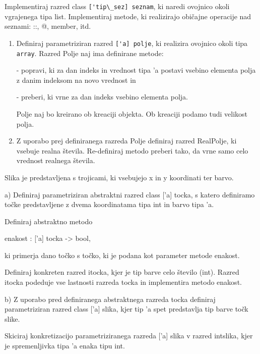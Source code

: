 \begin{ex}
Implementiraj razred class \lstinline{['tip\_sez] seznam}, ki naredi ovojnico okoli vgrajenega tipa list. Implementiraj metode, ki realizirajo obi\v cajne operacije nad seznami: ::, @, member, itd.



\end{ex}
\begin{ex}

\begin{enumerate}
\item Definiraj parametriziran razred \lstinline{['a] polje}, ki realizira ovojnico okoli tipa \lstinline{array}. Razred Polje naj ima definirane metode:

- popravi, ki za dan indeks in vrednost tipa 'a postavi vsebino elementa polja z danim indeksom na novo vrednost in

- preberi, ki vrne za dan indeks vsebino elementa polja. 

Polje naj bo kreirano ob kreaciji objekta. Ob kreaciji podamo tudi velikost polja.

\item Z uporabo prej definiranega razreda Polje definiraj razred RealPolje, ki vsebuje realna \v stevila. Re-definiraj metodo preberi tako, da vrne samo celo vrednost realnega \v stevila.
\end{enumerate}



\end{ex}
\begin{ex}
Slika je predstavljena s trojicami, ki vsebujejo x in y koordinati ter barvo.

a) Definiraj parametriziran abstraktni razred class ['a] tocka, s katero definiramo to\v cke predstavljene z dvema koordinatama tipa int in barvo tipa 'a. 

Definiraj abstraktno metodo 

enakost : ['a] tocka -> bool, 

ki primerja dano to\v cko s to\v cko, ki je podana kot parameter metode enakost. 

Definiraj konkreten razred itocka, kjer je tip barve celo \v stevilo (int). Razred itocka podeduje vse lastnosti razreda tocka in implementira metodo enakost.

b) Z uporabo pred definiranega abstraktnega razreda tocka definiraj parametriziran razred class ['a] slika, kjer tip 'a spet predstavlja tip barve to\v ck slike. 

Skiciraj konkretizacijo parametriziranega razreda ['a] slika v razred intslika, kjer je spremenljivka tipa 'a enaka tipu int.
\end{ex}
